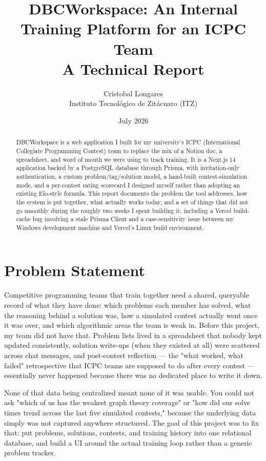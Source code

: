 \documentclass[11pt]{article}
\title{DBCWorkspace: An Internal Training Platform for an ICPC Team \\
\large A Technical Report}
\author{Cristobal Longares \\ Instituto Tecnológico de Zitácuaro (ITZ)}
\date{July 2026}
\begin{document}
\maketitle

\begin{abstract}
DBCWorkspace is a web application I built for my university's ICPC (International Collegiate Programming Contest) team to replace the mix of a Notion doc, a spreadsheet, and word of mouth we were using to track training. It is a Next.js 14 application backed by a PostgreSQL database through Prisma, with invitation-only authentication, a custom problem/tag/solution model, a hand-built contest-simulation mode, and a per-contest rating scorecard I designed myself rather than adopting an existing Elo-style formula. This report documents the problem the tool addresses, how the system is put together, what actually works today, and a set of things that did not go smoothly during the roughly two weeks I spent building it, including a Vercel build-cache bug involving a stale Prisma Client and a case-sensitivity issue between my Windows development machine and Vercel's Linux build environment.
\end{abstract}

\section{Problem Statement}

Competitive programming teams that train together need a shared, queryable record of what they have done: which problems each member has solved, what the reasoning behind a solution was, how a simulated contest actually went once it was over, and which algorithmic areas the team is weak in. Before this project, my team did not have that. Problem lists lived in a spreadsheet that nobody kept updated consistently, solution write-ups (when they existed at all) were scattered across chat messages, and post-contest reflection --- the "what worked, what failed" retrospective that ICPC teams are supposed to do after every contest --- essentially never happened because there was no dedicated place to write it down.

None of that data being centralized meant none of it was usable. You could not ask "which of us has the weakest graph theory coverage" or "how did our solve times trend across the last five simulated contests," because the underlying data simply was not captured anywhere structured. The goal of this project was to fix that: put problems, solutions, contests, and training history into one relational database, and build a UI around the actual training loop rather than a generic problem tracker.
\end{document}
